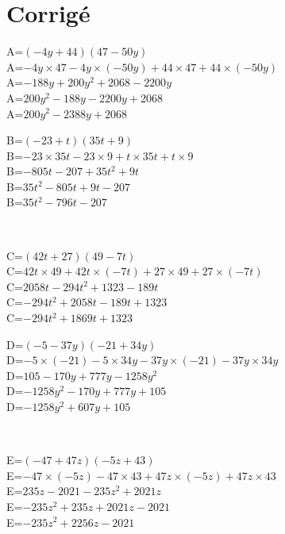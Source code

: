 \documentclass{article}%
\begin{document}
\section{Corrigé}%
\label{sec:Corrig}%
\begin{minipage}{0.5\textwidth}%
A=$(-4y+44)(47-50y)$\\%
A=$-4y \times 47-4y \times (-50y)+44 \times 47+44 \times (-50y)$\\%
A=$-188y+200y^2+2068-2200y$\\%
A=$200y^2-188y-2200y+2068$\\%
A=$200y^2-2388y+2068$\\%
\end{minipage}%
\begin{minipage}{0.5\textwidth}%
B=$(-23+t)(35t+9)$\\%
B=$-23 \times 35t-23 \times 9+t \times 35t+t \times 9$\\%
B=$-805t-207+35t^2+9t$\\%
B=$35t^2-805t+9t-207$\\%
B=$35t^2-796t-207$\\%
\end{minipage}%
\\%
\begin{minipage}{0.5\textwidth}%
C=$(42t+27)(49-7t)$\\%
C=$42t \times 49+42t \times (-7t)+27 \times 49+27 \times (-7t)$\\%
C=$2058t-294t^2+1323-189t$\\%
C=$-294t^2+2058t-189t+1323$\\%
C=$-294t^2+1869t+1323$\\%
\end{minipage}%
\begin{minipage}{0.5\textwidth}%
D=$(-5-37y)(-21+34y)$\\%
D=$-5 \times (-21)-5 \times 34y-37y \times (-21)-37y \times 34y$\\%
D=$105-170y+777y-1258y^2$\\%
D=$-1258y^2-170y+777y+105$\\%
D=$-1258y^2+607y+105$\\%
\end{minipage}%
\\%
\begin{minipage}{0.5\textwidth}%
E=$(-47+47z)(-5z+43)$\\%
E=$-47 \times (-5z)-47 \times 43+47z \times (-5z)+47z \times 43$\\%
E=$235z-2021-235z^2+2021z$\\%
E=$-235z^2+235z+2021z-2021$\\%
E=$-235z^2+2256z-2021$\\%
\end{minipage}%
\end{document}
